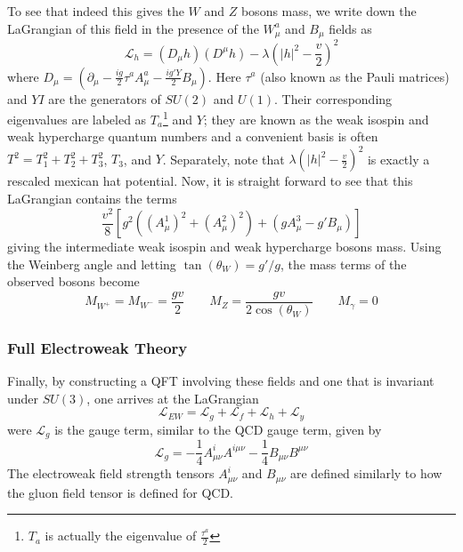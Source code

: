 To see that indeed this gives the $W$ and $Z$ bosons mass, we write down the LaGrangian of this field in the presence of the $W^a_\mu$ and $B_\mu$ fields as
\begin{equation}
\mathcal{L}_{h} = (D_{\mu}h)(D^\mu h) - \lambda\left(|h|^2- \frac{v}{2}\right)^2
\label{eq:higg-field-lagrangian}
\end{equation}
where $D_\mu = (\partial_\mu - \frac{ig}{2}\tau^a A^a_\mu - \frac{ig'Y}{2}B_\mu)$. Here $\tau^a$ (also known as the Pauli matrices) and $YI$ are the generators of $SU(2)$ and $U(1)$. Their corresponding eigenvalues are labeled as $T_a$\footnote{$T_a$ is actually the eigenvalue of $\frac{\tau^a}{2}$} and $Y$; they are known as the weak isospin and weak hypercharge quantum numbers and a convenient basis is often $T^2 = T_1^2 + T_2^2 + T_3^2$, $T_3$, and $Y$. Separately, note that $\lambda\left(|h|^2- \frac{v}{2}\right)^2$ is exactly a rescaled mexican hat potential. Now, it is straight forward to see that this LaGrangian contains the terms
\begin{equation}
\frac{v^2}{8}\left[g^2\left((A^{1}_{\mu})^2 + (A^{2}_{\mu})^2\right) + (gA_{\mu}^3 - g' B_{\mu})\right]
\end{equation}
giving the intermediate weak isospin and weak hypercharge bosons mass. Using the Weinberg angle and letting $\tan(\theta_W) = g'/g$, the mass terms of the observed bosons become
\begin{equation}
M_{W^+} = M_{W^-} = \frac{gv}{2} \quad\quad M_{Z} = \frac{gv}{2\cos(\theta_{W})} \quad\quad M_{\gamma} = 0
\end{equation}

\subsubsection{Full Electroweak Theory}

Finally, by constructing a QFT involving these fields and one that is invariant under $SU(3)$, one arrives at the LaGrangian
\begin{equation}
\mathcal{L}_{EW} = \mathcal{L}_{g} + \mathcal{L}_{f} + \mathcal{L}_{h} + \mathcal{L}_{y}
\end{equation}
were $\mathcal{L}_g$ is the gauge term, similar to the QCD gauge term, given by
\begin{equation}
\mathcal{L}_g = -\frac{1}{4}A^i_{\mu\nu}A^{i\mu\nu} - \frac{1}{4} B_{\mu\nu} B^{\mu\nu}
\end{equation}
The electroweak field strength tensors $A^i_{\mu\nu}$ and $B_{\mu\nu}$ are defined similarly to how the gluon field tensor is defined for QCD.

